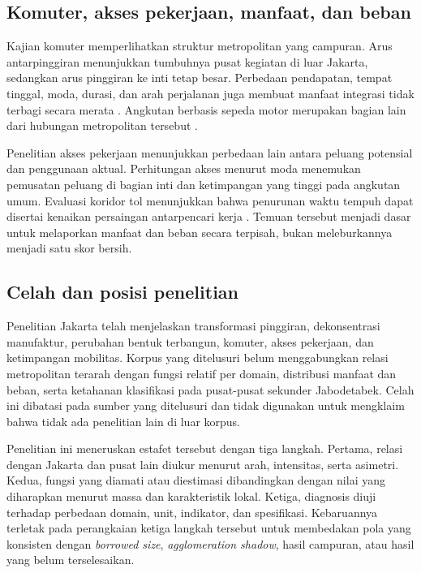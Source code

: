 \documentclass[11pt,a4paper,oneside,openany,indonesian]{report}
\begin{document}
\subsection{Komuter, akses pekerjaan, manfaat, dan beban}

Kajian komuter memperlihatkan struktur metropolitan yang campuran. Arus antarpinggiran menunjukkan tumbuhnya pusat kegiatan di luar Jakarta, sedangkan arus pinggiran ke inti tetap besar. Perbedaan pendapatan, tempat tinggal, moda, durasi, dan arah perjalanan juga membuat manfaat integrasi tidak terbagi secara merata \parencite{aritenang2023,aritenang2022}. Angkutan berbasis sepeda motor merupakan bagian lain dari hubungan metropolitan tersebut \parencite{aritenang2024}.

Penelitian akses pekerjaan menunjukkan perbedaan lain antara peluang potensial dan penggunaan aktual. Perhitungan akses menurut moda menemukan pemusatan peluang di bagian inti dan ketimpangan yang tinggi pada angkutan umum. Evaluasi koridor tol menunjukkan bahwa penurunan waktu tempuh dapat disertai kenaikan persaingan antarpencari kerja \parencite{andani2025,andani2021}. Temuan tersebut menjadi dasar untuk melaporkan manfaat dan beban secara terpisah, bukan meleburkannya menjadi satu skor bersih.

\subsection{Celah dan posisi penelitian}

Penelitian Jakarta telah menjelaskan transformasi pinggiran, dekonsentrasi manufaktur, perubahan bentuk terbangun, komuter, akses pekerjaan, dan ketimpangan mobilitas. Korpus yang ditelusuri belum menggabungkan relasi metropolitan terarah dengan fungsi relatif per domain, distribusi manfaat dan beban, serta ketahanan klasifikasi pada pusat-pusat sekunder Jabodetabek. Celah ini dibatasi pada sumber yang ditelusuri dan tidak digunakan untuk mengklaim bahwa tidak ada penelitian lain di luar korpus.

Penelitian ini meneruskan estafet tersebut dengan tiga langkah. Pertama, relasi dengan Jakarta dan pusat lain diukur menurut arah, intensitas, serta asimetri. Kedua, fungsi yang diamati atau diestimasi dibandingkan dengan nilai yang diharapkan menurut massa dan karakteristik lokal. Ketiga, diagnosis diuji terhadap perbedaan domain, unit, indikator, dan spesifikasi. Kebaruannya terletak pada perangkaian ketiga langkah tersebut untuk membedakan pola yang konsisten dengan \textit{borrowed size}, \textit{agglomeration shadow}, hasil campuran, atau hasil yang belum terselesaikan.
\end{document}

